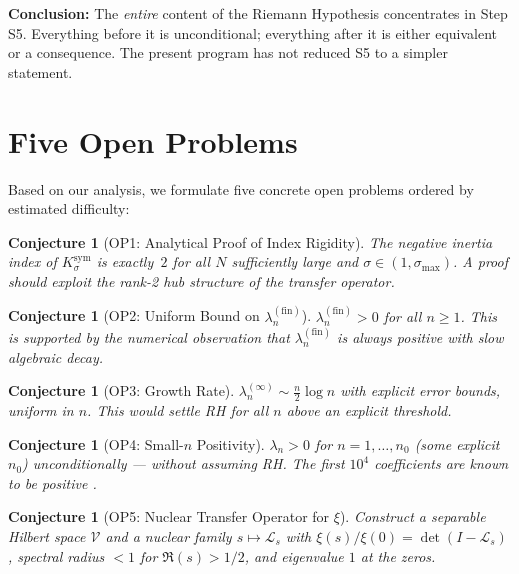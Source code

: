 \documentclass[12pt,a4paper]{article}
\newtheorem{conjecture}[theorem]{Conjecture}
\theoremstyle{definition}
\theoremstyle{remark}
\newcommand{\Ksym}{K_\sigma^{\mathrm{sym}}}
\begin{document}
\noindent\textbf{Conclusion:} The \emph{entire} content of the Riemann Hypothesis concentrates in Step S5. Everything before it is unconditional; everything after it is either equivalent or a consequence. The present program has not reduced S5 to a simpler statement.


\section{Five Open Problems}
\label{sec:open-problems}

Based on our analysis, we formulate five concrete open problems ordered by estimated difficulty:

\begin{conjecture}[OP1: Analytical Proof of Index Rigidity]
The negative inertia index of $\Ksym$ is exactly~$2$ for all $N$ sufficiently large and $\sigma \in (1, \sigma_{\max})$. A proof should exploit the rank-2 hub structure of the transfer operator.
\end{conjecture}

\begin{conjecture}[OP2: Uniform Bound on $\lambda_n^{(\mathrm{fin})}$]
$\lambda_n^{(\mathrm{fin})} > 0$ for all $n \geq 1$. This is supported by the numerical observation that $\lambda_n^{(\mathrm{fin})}$ is always positive with slow algebraic decay.
\end{conjecture}

\begin{conjecture}[OP3: Growth Rate]
$\lambda_n^{(\infty)} \sim \frac{n}{2}\log n$ with explicit error bounds, uniform in $n$. This would settle RH for all $n$ above an explicit threshold.
\end{conjecture}

\begin{conjecture}[OP4: Small-$n$ Positivity]
$\lambda_n > 0$ for $n = 1, \ldots, n_0$ (some explicit $n_0$) unconditionally --- without assuming RH. The first $10^4$ coefficients are known to be positive \cite{Keiper1992}.
\end{conjecture}

\begin{conjecture}[OP5: Nuclear Transfer Operator for $\xi$]
Construct a separable Hilbert space $\mathcal{V}$ and a nuclear family $s \mapsto \mathcal{L}_s$ with $\xi(s)/\xi(0) = \det(I - \mathcal{L}_s)$, spectral radius $< 1$ for $\Re(s) > 1/2$, and eigenvalue $1$ at the zeros.
\end{conjecture}
\end{document}
